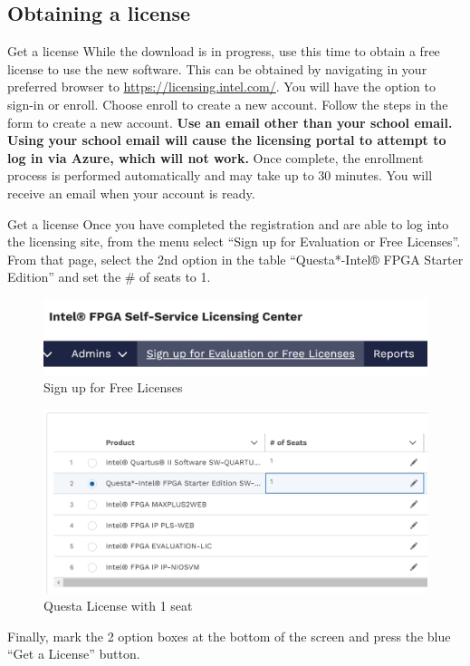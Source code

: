 \documentclass[fleqn]{beamer}
\newcommand{\quotes}[1]{``#1''}
\begin{document}
\subsection{Obtaining a license}
\begin{frame}{Get a license}
    While the download is in progress, use this time to obtain a free license to use the new software. This can be obtained by navigating in your preferred browser to \url{https://licensing.intel.com/}. You will have the option to sign-in or enroll. Choose enroll to create a new account. Follow the steps in the form to create a new account. \textbf{Use an email other than your school email. Using your school email will cause the licensing portal to attempt to log in via Azure, which will not work.} Once complete, the enrollment process is performed automatically and may take up to 30 minutes. You will receive an email when your account is ready.
\end{frame}
\begin{frame}{Get a license}
    Once you have completed the registration and are able to log into the licensing site, from the menu select \quotes{Sign up for Evaluation or Free Licenses}. From that page, select the 2nd option in the table \quotes{Questa*-Intel® FPGA Starter Edition} and set the \# of seats to 1.
    \begin{multicols}{2}
        \begin{figure}
            \centering
            \includegraphics[scale=.3]{figures/freelicenses.png}
            \caption{Sign up for Free Licenses}
            \label{fig:my_label}
        \end{figure}
        \begin{figure}
            \centering
            \includegraphics[scale=.3,trim={0 3cm 3cm 0},clip]{figures/questalicense.png}
            \caption{Questa License with 1 seat}
            \label{fig:my_label}
        \end{figure}
    \end{multicols}
    \vspace{-.5cm}
    Finally, mark the 2 option boxes at the bottom of the screen and press the blue \quotes{Get a License} button.
\end{frame}
\end{document}
